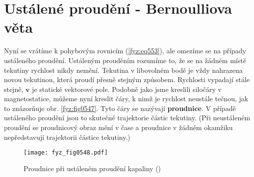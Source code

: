   \section{Ustálené proudění - Bernoulliova věta}\label{fyz:IIchapXLsecIII}
    Nyní se vrátíme k pohybovým rovnicím (\ref{fyz:eq553}), ale omezíme se na případy ustáleného 
    proudění. Ustáleným prouděním rozumíme to, že se na žádném místě tekutiny rychlost nikdy 
    nemění. Tekutina v libovolném bodě je vždy nahrazena novou tekutinou, která proudí přesně 
    stejným způsobem. Rychlosti vypadají stále stejně, \(\bm{v}\) je statické vektorové pole. 
    Podobně jako jsme kreslili siločáry v magnetostatice, můžeme nyní kreslit čáry, k nimž je 
    rychlost neustále tečnou, jak to znázorňuje obr. \ref{fyz:fig0547}. Tyto čáry se nazývají 
    \textbf{proudnice}. V případě ustáleného proudění jsou to skutečné trajektorie částic tekutiny. 
    (Při neustáleném proudění se proudnicový obraz mění v čase a proudnice v žádném okamžiku 
    nepředstavují trajektorii částice tekutiny.)
    
    \begin{figure}[ht!] %
      \centering
      \texttt{[image: fyz\_fig0548.pdf]}
      \caption{Proudnice při ustáleném proudění kapaliny
               (\cite[s.~747]{Feynman02})}
      \label{fyz:fig0548}
    \end{figure}
    
